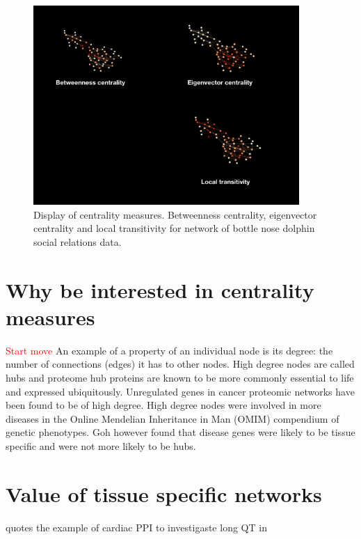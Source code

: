 \begin{figure}
    \centering
    \includegraphics[width=0.9\textwidth]{images/centrality2.002.png}
    \caption{Display of centrality measures. Betweenness centrality, eigenvector centrality and local transitivity for network of bottle nose dolphin social relations data. \cite{lusseau2003bottlenose}}
    \label{fig:dolphin}
\end{figure}

\section{Why be interested in centrality measures}
\textcolor{red}{Start move}
An example of a property of an individual node is its degree: the number of connections (edges) it has to other nodes. High degree nodes are called hubs and proteome hub proteins are known to be more commonly essential to life and expressed ubiquitously. \cite{goh2007human}  Unregulated genes in cancer proteomic networks have been found to be of high degree. \cite{wachi2005interactome}  High degree nodes were  involved in more diseases in the Online Mendelian Inheritance in Man (OMIM) compendium of genetic phenotypes. \cite{xu2006discovering}  Goh however found that disease genes were likely to be tissue specific and were not more likely to be hubs. \cite{goh2007human}  


\section{Value of tissue specific networks}
\cite{parikshak2015systems} quotes the example of cardiac PPI to investigaste long QT in \cite{lundby2014annotation}

